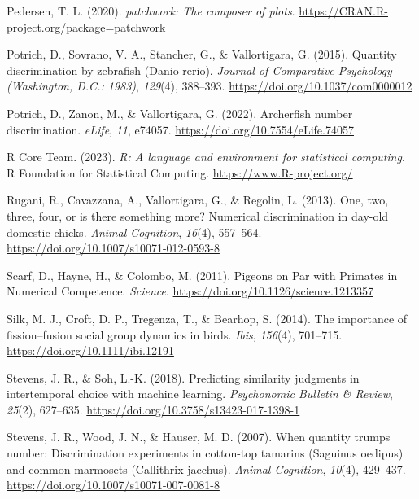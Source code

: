 \documentclass[
  ,pub,floatsintext]{apa6}
\newlength{\cslhangindent}
\newlength{\cslentryspacingunit} %
\newenvironment{CSLReferences}[2] %
 {%
  \setlength{\parindent}{0pt}
  \ifodd #1
  \let\oldpar\par
  \def\par{\hangindent=\cslhangindent\oldpar}
  \fi
  \setlength{\parskip}{#2\cslentryspacingunit}
 }%
 {}
\begin{document}
\begin{CSLReferences}{1}{0}
\leavevmode{}%
Pedersen, T. L. (2020). \emph{{patchwork}: The composer of plots}. \url{https://CRAN.R-project.org/package=patchwork}

\leavevmode{}%
Potrich, D., Sovrano, V. A., Stancher, G., \& Vallortigara, G. (2015). Quantity discrimination by zebrafish ({Danio} rerio). \emph{Journal of Comparative Psychology (Washington, D.C.: 1983)}, \emph{129}(4), 388--393. \url{https://doi.org/10.1037/com0000012}

\leavevmode{}%
Potrich, D., Zanon, M., \& Vallortigara, G. (2022). Archerfish number discrimination. \emph{eLife}, \emph{11}, e74057. \url{https://doi.org/10.7554/eLife.74057}

\leavevmode{}%
R Core Team. (2023). \emph{R: A language and environment for statistical computing}. R Foundation for Statistical Computing. \url{https://www.R-project.org/}

\leavevmode{}%
Rugani, R., Cavazzana, A., Vallortigara, G., \& Regolin, L. (2013). One, two, three, four, or is there something more? {Numerical} discrimination in day-old domestic chicks. \emph{Animal Cognition}, \emph{16}(4), 557--564. \url{https://doi.org/10.1007/s10071-012-0593-8}

\leavevmode{}%
Scarf, D., Hayne, H., \& Colombo, M. (2011). Pigeons on {Par} with {Primates} in {Numerical Competence}. \emph{Science}. \url{https://doi.org/10.1126/science.1213357}

\leavevmode{}%
Silk, M. J., Croft, D. P., Tregenza, T., \& Bearhop, S. (2014). The importance of fission--fusion social group dynamics in birds. \emph{Ibis}, \emph{156}(4), 701--715. \url{https://doi.org/10.1111/ibi.12191}

\leavevmode{}%
Stevens, J. R., \& Soh, L.-K. (2018). Predicting similarity judgments in intertemporal choice with machine learning. \emph{Psychonomic Bulletin \& Review}, \emph{25}(2), 627--635. \url{https://doi.org/10.3758/s13423-017-1398-1}

\leavevmode{}%
Stevens, J. R., Wood, J. N., \& Hauser, M. D. (2007). When quantity trumps number: Discrimination experiments in cotton-top tamarins ({Saguinus} oedipus) and common marmosets ({Callithrix} jacchus). \emph{Animal Cognition}, \emph{10}(4), 429--437. \url{https://doi.org/10.1007/s10071-007-0081-8}


\end{CSLReferences}
\end{document}
